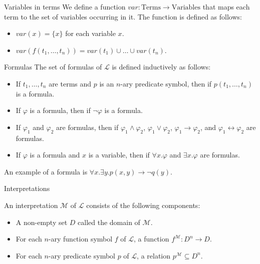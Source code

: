 \documentclass{beamer}
\begin{document}
  \begin{frame}{Variables in terms}
    We define a function $var: \text{Terms}\rightarrow\text{Variables}$ that maps each term to the set of variables occurring in it. The function is defined as follows:
    \begin{itemize}
    \item $var(x) = \{x\}$ for each variable $x$.
    \item $var(f(t_1, \ldots, t_n)) = var(t_1)\cup\ldots\cup var(t_n)$.
  \end{itemize}
  \end{frame}
  \begin{frame}{Formulas}
    The set of formulas of $\mathscr{L}$ is defined inductively as follows:
    \begin{itemize}
    \item If $t_1, \ldots, t_n$ are terms and $p$ is an $n$-ary predicate symbol, then if $p(t_1, \ldots, t_n)$ is a formula.
    \item If $\varphi$ is a formula, then if $\neg\varphi$ is a formula.
    \item If $\varphi_1$ and $\varphi_2$ are formulas, then if $\varphi_1\wedge\varphi_2$, $\varphi_1\vee\varphi_2$, $\varphi_1\rightarrow\varphi_2$, and $\varphi_1\leftrightarrow\varphi_2$ are formulas.
    \item If $\varphi$ is a formula and $x$ is a variable, then if $\forall x.\varphi$ and $\exists x.\varphi$ are formulas.
  \end{itemize}
  An example of a formula is $\forall x. \exists y. p(x, y) \rightarrow \neg q(y)$.
  \end{frame}

  \begin{frame}{Interpretations}
    
    An interpretation $\mathcal{M}$ of $\mathscr{L}$ consists of the following components:
    \begin{itemize}
    \item A non-empty set $D$ called the domain of $\mathcal{M}$.
    \item For each $n$-ary function symbol $f$ of $\mathscr{L}$, a function $f^{\mathcal{M}}: D^n\rightarrow D$.
    \item For each $n$-ary predicate symbol $p$ of $\mathscr{L}$, a relation $p^{\mathcal{M}}\subseteq D^n$.
  \end{itemize}
  \end{frame}
\end{document}
